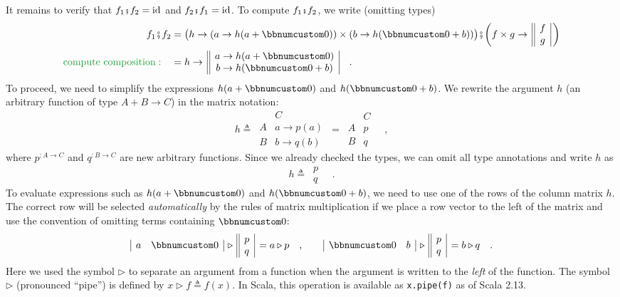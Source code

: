 It remains to verify that $f_{1}\bef f_{2}=\text{id}$ and $f_{2}\bef f_{1}=\text{id}$.
To compute $f_{1}\bef f_{2}$, we write (omitting types)
\begin{align*}
f_{1}\bef f_{2} & =\big(h\rightarrow(a\rightarrow h(a+\bbnum 0))\times(b\rightarrow h(\bbnum 0+b))\big)\bef\bigg(f\times g\rightarrow\,\begin{array}{||c|}
f\\
g
\end{array}\,\bigg)\\
{\color{greenunder}\text{compute composition}:}\quad & =h\rightarrow\,\begin{array}{||c|}
a\rightarrow h(a+\bbnum 0)\\
b\rightarrow h(\bbnum 0+b)
\end{array}\quad.
\end{align*}
To proceed, we need to simplify the expressions $h(a+\bbnum 0)$ and
$h(\bbnum 0+b)$. We rewrite the argument $h$ (an arbitrary function
of type $A+B\rightarrow C$) in the matrix notation:
\[
h\triangleq\,\begin{array}{|c||c|}
 & C\\
\hline A & a\rightarrow p(a)\\
B & b\rightarrow q(b)
\end{array}\,=\,\begin{array}{|c||c|}
 & C\\
\hline A & p\\
B & q
\end{array}\quad,
\]
where $p^{:A\rightarrow C}$ and $q^{:B\rightarrow C}$ are new arbitrary
functions. Since we already checked the types, we can omit all type
annotations and write $h$ as
\[
h\triangleq\,\begin{array}{||c|}
p\\
q
\end{array}\quad.
\]
To evaluate expressions such as $h(a+\bbnum 0)$ and $h(\bbnum 0+b)$,
we need to use one of the rows of the column matrix $h$. The correct
row will be selected \emph{automatically} by the rules of matrix multiplication
if we place a row vector to the left of the matrix and use the convention
of omitting terms containing $\bbnum 0$:
\[
\begin{array}{|cc|}
a & \bbnum 0\end{array}\,\triangleright\,\begin{array}{||c|}
p\\
q
\end{array}\,=a\triangleright p\quad,\quad\quad\begin{array}{|cc|}
\bbnum 0 & b\end{array}\,\triangleright\,\begin{array}{||c|}
p\\
q
\end{array}\,=b\triangleright q\quad.
\]
Here we used the symbol $\triangleright$ to separate an argument
from a function when the argument is written to the \emph{left} of
the function. The symbol $\triangleright$ (pronounced \textsf{``}pipe\textsf{''})
is defined by $x\triangleright f\triangleq f(x)$. In Scala, this
operation is available as \lstinline!x.pipe(f)! as of Scala 2.13.

